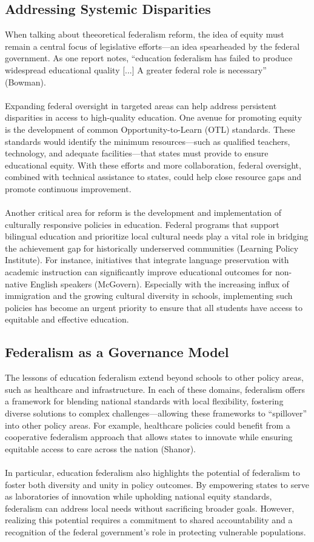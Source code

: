 \documentclass[11pt]{extarticle}
\begin{document}
\subsection{Addressing Systemic Disparities}
When talking about theeoretical federalism reform, the idea of equity must remain a central focus of legislative efforts---an idea spearheaded by the federal government. As one report notes, ``education federalism has failed to produce widespread educational quality [...] A greater federal role is necessary” (Bowman).
\\
\\
Expanding federal oversight in targeted areas can help address persistent disparities in access to high-quality education. One avenue for promoting equity is the development of common Opportunity-to-Learn (OTL) standards. These standards would identify the minimum resources—such as qualified teachers, technology, and adequate facilities—that states must provide to ensure educational equity. With these efforts and more collaboration, federal oversight, combined with technical assistance to states, could help close resource gaps and promote continuous improvement.\\
\\
Another critical area for reform is the development and implementation of culturally responsive policies in education. Federal programs that support bilingual education and prioritize local cultural needs play a vital role in bridging the achievement gap for historically underserved communities (Learning Policy Institute). For instance, initiatives that integrate language preservation with academic instruction can significantly improve educational outcomes for non-native English speakers (McGovern). Especially with the increasing influx of immigration and the growing cultural diversity in schools, implementing such policies has become an urgent priority to ensure that all students have access to equitable and effective education.
\subsection{Federalism as a Governance Model}
The lessons of education federalism extend beyond schools to other policy areas, such as healthcare and infrastructure. In each of these domains, federalism offers a framework for blending national standards with local flexibility, fostering diverse solutions to complex challenges---allowing these frameworks to ``spillover'' into other policy areas. For example, healthcare policies could benefit from a cooperative federalism approach that allows states to innovate while ensuring equitable access to care across the nation (Shanor).\\
\\
In particular, education federalism also highlights the potential of federalism to foster both diversity and unity in policy outcomes. By empowering states to serve as laboratories of innovation while upholding national equity standards, federalism can address local needs without sacrificing broader goals. However, realizing this potential requires a commitment to shared accountability and a recognition of the federal government’s role in protecting vulnerable populations. 
\end{document}
